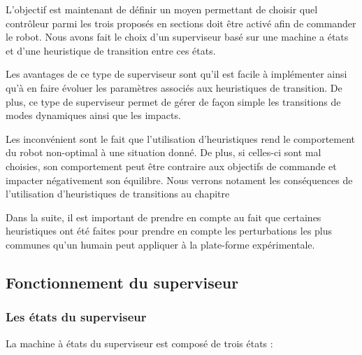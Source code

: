 			L'objectif est maintenant de définir un moyen permettant de choisir quel contrôleur parmi les trois proposés en sections  doit être activé afin de commander le robot.
			Nous avons fait le choix d'un superviseur basé sur une machine a états et d'une heuristique de transition entre ces états.
		
			Les avantages de ce type de superviseur sont qu'il est facile à implémenter ainsi qu'à en faire évoluer les paramètres associés aux heuristiques de transition.
			De plus, ce type de superviseur permet de gérer de façon simple les transitions de modes dynamiques ainsi que les impacts.
			
			Les inconvénient sont le fait que l'utilisation d'heuristiques rend le comportement du robot non-optimal à une situation donné.
			De plus, si celles-ci sont mal choisies, son comportement peut être contraire aux objectifs de commande et impacter négativement son équilibre. 
			Nous verrons notament les conséquences de l'utilisation d'heuristiques de transitions au chapitre 
			
			Dans la suite, il est important de prendre en compte au fait que certaines heuristiques ont été faites pour prendre en compte les perturbations les plus communes qu'un humain peut appliquer à la plate-forme expérimentale.
			
		\subsection{Fonctionnement du superviseur}

			
			\subsubsection{Les états du superviseur}
				
				
				La machine à états du superviseur est composé de trois états  :
				
